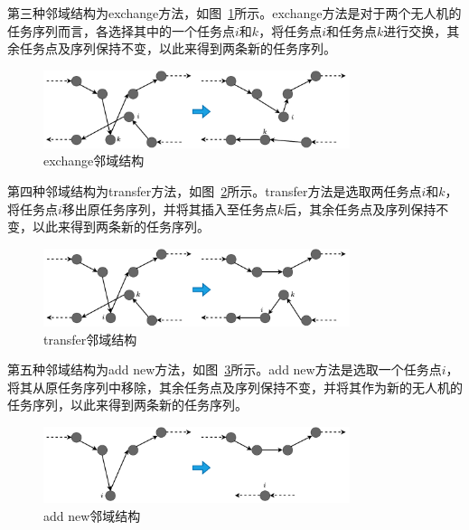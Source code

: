 第三种邻域结构为exchange方法，如图~\ref{fig:exchange邻域结构}所示。exchange方法是对于两个无人机的任务序列而言，各选择其中的一个任务点\( i \)和\( k \)，将任务点\( i \)和任务点\( k \)进行交换，其余任务点及序列保持不变，以此来得到两条新的任务序列。

\begin{figure}[!htbp]
    \centering
    \includegraphics[width=0.8\textwidth]{images/exchange.pdf}
    \caption{exchange邻域结构}
    \label{fig:exchange邻域结构}
\end{figure}

第四种邻域结构为transfer方法，如图~\ref{fig:transfer邻域结构}所示。transfer方法是选取两任务点\( i \)和\( k \)，将任务点\( i \)移出原任务序列，并将其插入至任务点\( k \)后，其余任务点及序列保持不变，以此来得到两条新的任务序列。

\begin{figure}[!htbp]
    \centering
    \includegraphics[width=0.8\textwidth]{images/transfer.pdf}
    \caption{transfer邻域结构}
    \label{fig:transfer邻域结构}
\end{figure}

第五种邻域结构为add new方法，如图~\ref{fig:add new邻域结构}所示。add new方法是选取一个任务点\( i \)，将其从原任务序列中移除，其余任务点及序列保持不变，并将其作为新的无人机的任务序列，以此来得到两条新的任务序列。

\begin{figure}[!htbp]
    \centering
    \includegraphics[width=0.8\textwidth]{images/add_new.pdf}
    \caption{add new邻域结构}
    \label{fig:add new邻域结构}
\end{figure}

